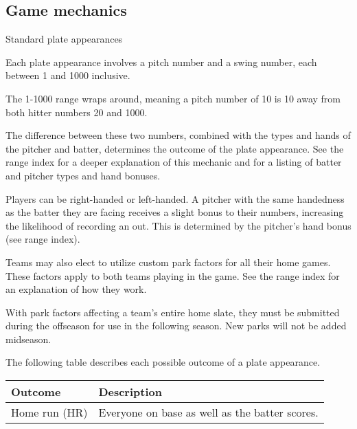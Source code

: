 
\subsection{Game mechanics}
\begin{deepEnumerate}
	\item Standard plate appearances
	\begin{deepEnumerate}
		\item Each plate appearance involves a pitch number and a swing number, each between 1 and 1000 inclusive.
		\item The 1-1000 range wraps around, meaning a pitch number of 10 is 10 away from both hitter numbers 20 and 1000.
		\item The difference between these two numbers, combined with the types and hands of the pitcher and batter, 
		determines the outcome of the plate appearance. 
		See the range index 
		for a deeper explanation of this mechanic and for a listing of batter and pitcher types and hand bonuses. %
		\item Players can be right-handed or left-handed. 
		A pitcher with the same handedness as the batter they are facing receives a slight bonus to their numbers, 
		increasing the likelihood of recording an out. 
		This is determined by the pitcher’s hand bonus (see range index). %
		\item Teams may also elect to utilize custom park factors for all their home games. 
		These factors apply to both teams playing in the game. 
		See the range index for an explanation of how they work. %
		\begin{deepEnumerate}
			\item With park factors affecting a team’s entire home slate, 
			they must be submitted during the offseason for use in the following season. 
			New parks will not be added midseason.
		\end{deepEnumerate}
		\item The following table describes each possible outcome of a plate appearance.
		\begin{center}
			\begin{longtable}{|p{3cm}|p{8cm}|}
				\hline
				\textbf{Outcome}           & \textbf{Description}                                                  \\
				\hline
				Home run (HR)              & Everyone on base as well as the batter scores.                        \\

\end{longtable}
\end{center}
\end{deepEnumerate}
\end{deepEnumerate}
